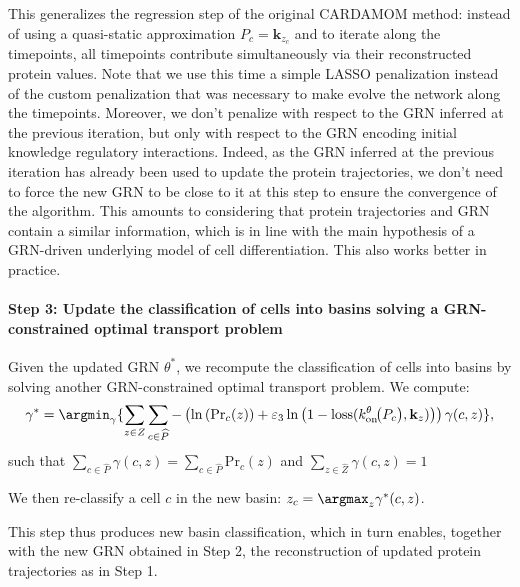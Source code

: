 This generalizes the regression step of the original CARDAMOM method: instead of using a
quasi-static approximation $P_c=\mathbf{k}_{z_c}$ and to iterate along the timepoints, all timepoints contribute simultaneously via their reconstructed protein values. Note that we use this time a simple LASSO penalization instead of the custom penalization that was necessary to make evolve the network along the timepoints. Moreover, we don't penalize with respect to the GRN inferred at the previous iteration, but only with respect to the GRN encoding initial knowledge regulatory interactions. Indeed, as the GRN inferred at the previous iteration has already been used to update the protein trajectories, we don't need to force the new GRN to be close to it at this step to ensure the convergence of the algorithm. This amounts to considering that protein trajectories and GRN contain a similar information, which is in line with the main hypothesis of a GRN-driven underlying model of cell differentiation. This also works better in practice.


\paragraph{Step 3: Update the classification of cells into basins solving a GRN-constrained optimal transport problem}

Given the updated GRN $\theta^*$, we recompute the classification of cells into basins by solving another GRN-constrained optimal transport problem. We compute:
\begin{equation}
\label{eq:basins_update}
\gamma^* = \argmin_{\gamma}\{\sum_{z \in Z}
      \sum_{c \in \widehat P}-\left(\ln\left(\mathrm{Pr}_c(z)\right) + \varepsilon_3 \ln\left(1 - \mathrm{loss}(
         k^{\theta}_{\mathrm{on}}\!\big(P_c\big)
         , \mathbf{k}_{z})\right)\right) \gamma(c, z)\},
\end{equation}
such that $\sum\limits_{c \in \widehat P}\gamma(c, z) = \sum\limits_{c \in \widehat P}\mathrm{Pr}_c(z)$ and 
$\sum\limits_{z \in \widehat Z}\gamma(c, z) = 1$

We then re-classify a cell $c$ in the new basin: $z_c = \argmax_z \gamma^*(c, z)$.

This step thus produces new basin classification, which in turn enables, together with the new GRN obtained in Step 2, the reconstruction of updated protein trajectories as in Step 1.\\

